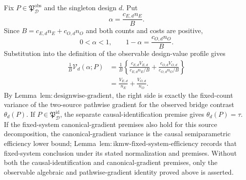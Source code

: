 Fix \(P\in\mathfrak P_{\mathcal D}^{\mathrm{obs}}\) and the singleton design \(d\).  Put
\[
 \alpha=\frac{c_{E,d}n_E}{B}.
\]
Since \(B=c_{E,d}n_E+c_{O,d}n_O\) and both counts and costs are positive,
\[
 0<\alpha<1,
 \qquad
 1-\alpha=\frac{c_{O,d}n_O}{B}.
\]
Substitution into the definition of the observable design-value profile gives
\[
\begin{aligned}
 \frac1B\mathcal V_d(\alpha;P)
 &=\frac1B\left\{
 \frac{c_{E,d}V_{E,d}}{c_{E,d}n_E/B}
 +\frac{c_{O,d}V_{O,d}}{c_{O,d}n_O/B}\right\}\\
 &=\frac{V_{E,d}}{n_E}+\frac{V_{O,d}}{n_O}.
\end{aligned}
\]
By Lemma~\(\mathrm{lem{:}designwise\text{-}gradient}\), the right side is exactly the fixed-count variance of the two-source pathwise gradient for the observed bridge contrast \(\theta_d(P)\).  If \(P\in\mathfrak P_{\mathcal D}^{\mathrm{id}}\), the separate causal-identification premise gives \(\theta_d(P)=\tau\).  If the fixed-system canonical-gradient premises also hold for this source decomposition, the canonical-gradient variance is the causal semiparametric efficiency lower bound; Lemma~\(\mathrm{lem{:}ikmw\text{-}fixed\text{-}system\text{-}efficiency}\) records that fixed-system conclusion under its stated normalization and premises.  Without both the causal-identification and canonical-gradient premises, only the observable algebraic and pathwise-gradient identity proved above is asserted.